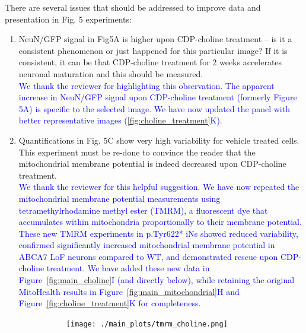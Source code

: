 \documentclass[12pt]{article}
\begin{document}
There are several issues that should be addressed to improve data and presentation in Fig. 5 experiments:
\begin{enumerate}
	\item NeuN/GFP signal in Fig5A is higher upon CDP-choline treatment – is it a consistent phenomenon or just happened for this particular image? If it is consistent, it can be that CDP-choline treatment for 2 weeks accelerates neuronal maturation and this should be measured.\\
	\textcolor{blue}{We thank the reviewer for highlighting this observation. The apparent increase in NeuN/GFP signal upon CDP-choline treatment (formerly Figure 5A) is specific to the selected image. We have now updated the panel with better representative images (\ref{fig:choline_treatment}K).}

	\item Quantifications in Fig. 5C show very high variability for vehicle treated cells. This experiment must be re-done to convince the reader that the mitochondrial membrane potential is indeed decreased upon CDP-choline treatment.\\
	\textcolor{blue}{We thank the reviewer for this helpful suggestion. We have now repeated the mitochondrial membrane potential measurements using tetramethylrhodamine methyl ester (TMRM), a fluorescent dye that accumulates within mitochondria proportionally to their membrane potential. These new TMRM experiments in p.Tyr622* iNs showed reduced variability, confirmed significantly increased mitochondrial membrane potential in ABCA7 LoF neurons compared to WT, and demonstrated rescue upon CDP-choline treatment. We have added these new data in Figure~\ref{fig:main_choline}I (and directly below), while retaining the original MitoHealth results in Figure~\ref{fig:main_mitochondrial}H and Figure~\ref{fig:choline_treatment}K for completeness.}

	\begin{figure}[H]
		\centering
		\begin{subfigure}[t]{.6\textwidth}
			\vspace{-0.15cm}
			\texttt{[image: ./main\_plots/tmrm\_choline.png]}        
		\end{subfigure} 
	\end{figure}


\end{enumerate}
\end{document}
